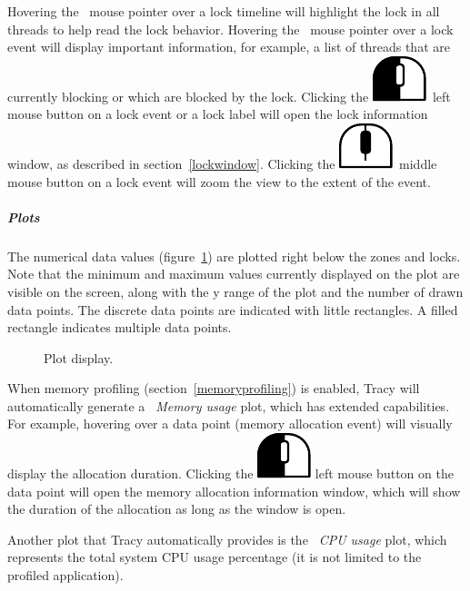 \documentclass[hidelinks,titlepage,a4paper]{article}
\newcommand{\LMB}{\includegraphics[height=.8\baselineskip]{icons/lmb}}
\newcommand{\MMB}{\includegraphics[height=.8\baselineskip]{icons/mmb}}
\begin{document}
Hovering the \faMousePointer{}~mouse pointer over a lock timeline will highlight the lock in all threads to help read the lock behavior. Hovering the \faMousePointer{}~mouse pointer over a lock event will display important information, for example, a list of threads that are currently blocking or which are blocked by the lock. Clicking the \LMB{}~left mouse button on a lock event or a lock label will open the lock information window, as described in section~\ref{lockwindow}. Clicking the \MMB{}~middle mouse button on a lock event will zoom the view to the extent of the event.

\subparagraph{Plots}
\label{plots}

The numerical data values (figure~\ref{plot}) are plotted right below the zones and locks. Note that the minimum and maximum values currently displayed on the plot are visible on the screen, along with the y range of the plot and the number of drawn data points. The discrete data points are indicated with little rectangles. A filled rectangle indicates multiple data points.

\begin{figure}[h]
\centering{}
\caption{Plot display.}
\label{plot}
\end{figure}

When memory profiling (section~\ref{memoryprofiling}) is enabled, Tracy will automatically generate a \emph{\faMemory{}~Memory usage} plot, which has extended capabilities. For example, hovering over a data point (memory allocation event) will visually display the allocation duration. Clicking the \LMB{} left mouse button on the data point will open the memory allocation information window, which will show the duration of the allocation as long as the window is open.

Another plot that Tracy automatically provides is the \emph{\faTachometer*{}~CPU usage} plot, which represents the total system CPU usage percentage (it is not limited to the profiled application).
\end{document}
